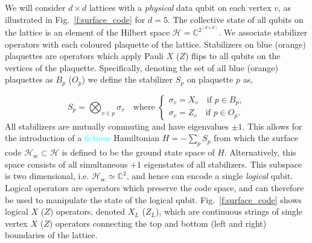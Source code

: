 \documentclass[twocolumn,preprintnumbers,amsmath,amssymb,notitlepage,nofootinbib,longbibliography,superscriptaddress,aps,pra,10pt]{revtex4-1}
\newcommand{\je}[1]{\textcolor{cyan}{#1}}
\begin{document}
	We will consider $d\times d$ lattices with a \textit{physical} data qubit on each vertex $v$, as illustrated in Fig.~\ref{f:surface_code} for $d=5$.
	The collective state of all qubits on the lattice is an element of the Hilbert space $\mathcal{H} = \mathbb{C}^{2^{(d\times d)}}$.
	We associate stabilizer operators with each coloured plaquette of the lattice.
	Stabilizers on blue (orange) plaquettes are operators which apply Pauli $X$ ($Z$) flips to all qubits on the vertices of the plaquette.
	Specifically, denoting the set of all blue (orange) plaquettes as $B_p$ ($O_p$) we define the stabilizer $S_p$ on plaquette $p$ as,

	\begin{equation}\label{e:stabilizer_definition}
		S_p = \bigotimes_{v\in p} \sigma_v \quad \text{where }
		\begin{cases}
			\sigma_v = X_v \quad \text{if } p \in B_p,\\
			\sigma_v = Z_v \quad \text{if } p \in O_p.
		\end{cases}
	\end{equation}
	All stabilizers are mutually commuting and have eigenvalues $\pm 1$.
	This allows for the introduction of a \je{fictious} Hamiltonian $H = -\sum_p S_p$ from which the surface code $\mathcal{H}_\mathrm{sc} \subset \mathcal{H}$ is defined to be the ground state space of $H$.
	Alternatively, this space consists of all simultaneous $+1$ eigenstates of all stabilizers.
	This subspace is two dimensional, i.e. $\mathcal{H}_\mathrm{sc} \simeq \mathbb{C}^2$, and hence can encode a single \textit{logical} qubit.
	Logical operators are operators which preserve the code space, and can therefore be used to manipulate the state of the logical qubit.
	Fig.~\ref{f:surface_code} shows logical $X$ ($Z$) operators, denoted $X_L$ ($Z_L$), which are continuous strings of single vertex $X$ ($Z$) operators connecting the top and bottom (left and right) boundaries of the lattice.
\end{document}
